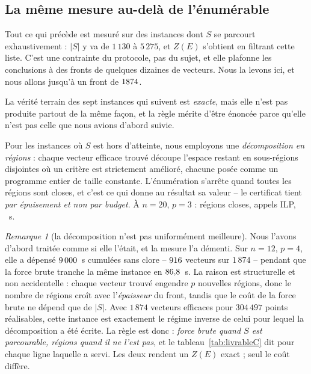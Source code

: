 \documentclass[11pt,a4paper]{article}
\theoremstyle{plain}
\theoremstyle{remark}
\newtheorem{remark}{Remarque}
\begin{document}
\subsection{La même mesure au-delà de l'énumérable}
\label{sec:livrablegrand}

Tout ce qui précède est mesuré sur des instances dont $S$ se parcourt
exhaustivement : $|S|$ y va de $1\,130$ à $5\,275$, et $Z(E)$ s'obtient en
filtrant cette liste. C'est une contrainte du protocole, pas du sujet, et
elle plafonne les conclusions à des fronts de quelques dizaines de vecteurs.
Nous la levons ici, et nous allons jusqu'à un front de $1874{}$.

La vérité terrain des sept instances qui suivent est \emph{exacte}, mais
elle n'est pas produite partout de la même façon, et la règle mérite d'être
énoncée parce qu'elle n'est pas celle que nous avions d'abord suivie.

Pour les instances où $S$ est hors d'atteinte, nous employons une
\emph{décomposition en régions} : chaque vecteur efficace trouvé découpe
l'espace restant en sous-régions disjointes où un critère est strictement
amélioré, chacune posée comme un programme entier de taille constante.
L'énumération s'arrête quand toutes les régions sont closes, et c'est ce qui
donne au résultat sa valeur -- le certificat tient \emph{par épuisement et
non par budget}. À $n=20$, $p=3$ : \grandRegions{} régions closes,
\grandIlp{} appels ILP, \grandSecondes{}~s.

\begin{remark}[la décomposition n'est pas uniformément meilleure]
Nous l'avons d'abord traitée comme si elle l'était, et la mesure l'a
démenti. Sur $n=12$, $p=4$, elle a dépensé $9\,000{}$~s cumulées
sans clore -- $916{}$ vecteurs sur $1\,874$ -- pendant que la
force brute tranche la même instance en $86{,}8{}$~s. La raison est
structurelle et non accidentelle : chaque vecteur trouvé engendre $p$
nouvelles régions, donc le nombre de régions croît avec l'\emph{épaisseur}
du front, tandis que le coût de la force brute ne dépend que de $|S|$. Avec
$1\,874$ vecteurs efficaces pour $304\,497$ points réalisables, cette
instance est exactement le régime inverse de celui pour lequel la
décomposition a été écrite. La règle est donc : \emph{force brute quand $S$
est parcourable, régions quand il ne l'est pas}, et le
tableau~\ref{tab:livrableC} dit pour chaque ligne laquelle a servi. Les
deux rendent un $Z(E)$ exact ; seul le coût diffère.
\end{remark}
\end{document}

